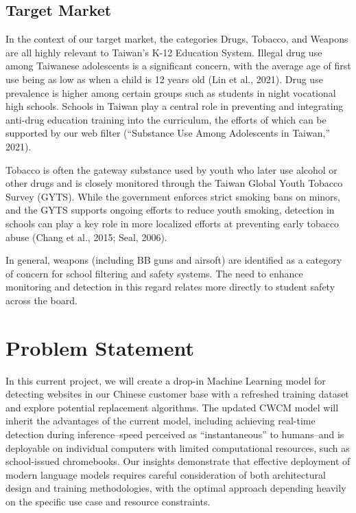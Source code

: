 \documentclass[
  titlepage]{article}
\begin{document}
\subsection{Target Market}\label{target-market}

In the context of our target market, the categories Drugs, Tobacco, and
Weapons are all highly relevant to Taiwan's K-12 Education System.
Illegal drug use among Taiwanese adolescents is a significant concern,
with the average age of first use being as low as when a child is 12
years old (Lin et al., 2021). Drug use prevalence is higher among
certain groups such as students in night vocational high schools.
Schools in Taiwan play a central role in preventing and integrating
anti-drug education training into the curriculum, the efforts of which
can be supported by our web filter ({``Substance Use Among Adolescents
in Taiwan,''} 2021).

Tobacco is often the gateway substance used by youth who later use
alcohol or other drugs and is closely monitored through the Taiwan
Global Youth Tobacco Survey (GYTS). While the government enforces strict
smoking bans on minors, and the GYTS supports ongoing efforts to reduce
youth smoking, detection in schools can play a key role in more
localized efforts at preventing early tobacco abuse (Chang et al., 2015;
Seal, 2006).

In general, weapons (including BB guns and airsoft) are identified as a
category of concern for school filtering and safety systems. The need to
enhance monitoring and detection in this regard relates more directly to
student safety across the board.

\section{Problem Statement}\label{problem-statement}

In this current project, we will create a drop-in Machine Learning model
for detecting websites in our Chinese customer base with a refreshed
training dataset and explore potential replacement algorithms. The
updated CWCM model will inherit the advantages of the current model,
including achieving real-time detection during inference--speed
perceived as ``instantaneous'' to humans--and is deployable on
individual computers with limited computational resources, such as
school-issued chromebooks. Our insights demonstrate that effective
deployment of modern language models requires careful consideration of
both architectural design and training methodologies, with the optimal
approach depending heavily on the specific use case and resource
constraints.
\end{document}
